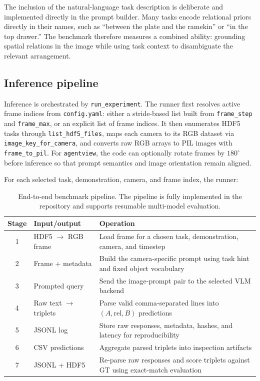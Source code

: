 \documentclass{article}
\begin{document}
The inclusion of the natural-language task description is deliberate and implemented directly in the prompt builder. Many tasks encode relational priors directly in their names, such as ``between the plate and the ramekin'' or ``in the top drawer.'' The benchmark therefore measures a combined ability: grounding spatial relations in the image while using task context to disambiguate the relevant arrangement.

\subsection{Inference pipeline}
Inference is orchestrated by \texttt{run\_experiment}. The runner first resolves active frame indices from \texttt{config.yaml}: either a stride-based list built from \texttt{frame\_step} and \texttt{frame\_max}, or an explicit list of frame indices. It then enumerates HDF5 tasks through \texttt{list\_hdf5\_files}, maps each camera to its RGB dataset via \texttt{image\_key\_for\_camera}, and converts raw RGB arrays to PIL images with \texttt{frame\_to\_pil}. For \texttt{agentview}, the code can optionally rotate frames by $180^\circ$ before inference so that prompt semantics and image orientation remain aligned.

For each selected task, demonstration, camera, and frame index, the runner:
\begin{table}[t]
    \caption{End-to-end benchmark pipeline. The pipeline is fully implemented in the repository and supports resumable multi-model evaluation.}
    \label{tab:pipeline}
    \centering
    \begin{tabularx}{\linewidth}{clX}
        \toprule
        Stage & Input/output & Operation \\
        \midrule
        1 & HDF5 $\rightarrow$ RGB frame & Load frame for a chosen task, demonstration, camera, and timestep \\
        2 & Frame + metadata & Build the camera-specific prompt using task hint and fixed object vocabulary \\
        3 & Prompted query & Send the image-prompt pair to the selected VLM backend \\
        4 & Raw text $\rightarrow$ triplets & Parse valid comma-separated lines into $(A,\mathrm{rel},B)$ predictions \\
        5 & JSONL log & Store raw responses, metadata, hashes, and latency for reproducibility \\
        6 & CSV predictions & Aggregate parsed triplets into inspection artifacts \\
        7 & JSONL + HDF5 & Re-parse raw responses and score triplets against GT using exact-match evaluation \\
        \bottomrule
    \end{tabularx}
\end{table}
\end{document}
